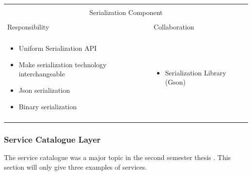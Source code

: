\begin{tabular}{|l|l|}
    \cline{1-2}
    \multicolumn{2}{|c|}{} \\[-0.3cm]
    \multicolumn{2}{|c|}{Serialization Component} \\ 
    \multicolumn{2}{|c|}{} \\[-0.3cm]
    \cline{1-2}
    Responsibility & Collaboration \\
    \cline{1-2}
    & \\[-0.2cm]
    \begin{minipage}{6.5cm}
        \begin{itemize}
          \item Uniform Serialization API
          \item Make serialization technology interchangeable
          \item Json serialization
          \item Binary serialization
        \end{itemize} 
    \end{minipage}
	&
    \begin{minipage}{6.5cm}
        \begin{itemize}
          \item Serialization Library (Gson)
        \end{itemize} 
    \end{minipage}
	\\ & \\
    \hline
\end{tabular}

\subsubsection{Service Catalogue Layer}

The service catalogue was a major topic in the second semester thesis
. This section will only give three examples of services.\\

